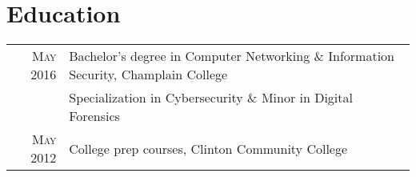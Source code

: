 \documentclass[a4paper,10pt]{article}
\begin{document}
\section{Education}
\begin{tabular}{rl}
    \hspace{4mm}\textsc{May 2016} & \footnotesize{Bachelor's degree in  Computer Networking \& Information Security, Champlain College}\\
                          & \footnotesize{Specialization in Cybersecurity \& Minor in Digital Forensics}\\
    \hspace{4mm}\textsc{May 2012} & \footnotesize{College prep courses, Clinton Community College}\\
\end{tabular}
\end{document}
